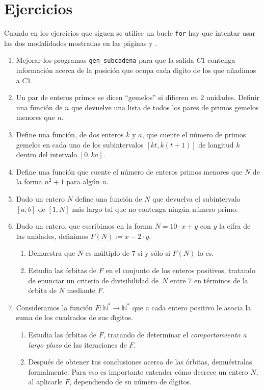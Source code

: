 \section{Ejercicios}\label{ej-program}





Cuando en los ejercicios que siguen se utilice un bucle \lstinline|for| hay que
intentar usar las dos modalidades mostradas en las páginas
\pageref{for-sintaxis1} y \pageref{for-sintaxis2}.


\begin{enumerate}
\item Mejorar los programas {\tt gen\_subcadena} para que la salida $C1$
contenga
informaci\'on acerca de la posici\'on que ocupa cada d\'{\i}gito de los que
a\~nadimos a $C1.$
 \item Un par de enteros primos se dicen ``gemelos'' si difieren en $2$
unidades. Definir una funci\'on de $n$ que devuelve una lista de todos los pares
de primos gemelos menores que $n$.
 \item Define una funci\'on, de dos enteros $k$ y $a$,  que cuente el n\'umero
de primos gemelos en cada uno de los subintervalos $[kt,k(t+1)]$ de longitud $k$
dentro del intervalo $[0,ka].$
 \item Define una funci\'on que cuente el n\'umero de enteros primos menores que
$N$ de la forma $n^2+1$ para alg\'un $n$.

 \item Dado un entero $N$ define una funci\'on de $N$ que devuelva  el
subintervalo $[a,b]$ de $[1,N]$ m\'as largo tal que no contenga ning\'un
n\'umero primo. 

\item Dado un entero, que escribimos en la forma  $N=10\cdot x+y$ con $y$ la
cifra de las unidades,   definimos $F(N):=x-2\cdot y.$
\begin{enumerate}
\item Demuestra que $N$ es m\'ultiplo de $7$ si y s\'olo si $F(N)$ lo es.
\item Estudia las \'orbitas de $F$ en el conjunto de los enteros positivos,
tratando de enunciar un criterio de divisibilidad de~$N$ entre  $7$ en
t\'erminos de la \'orbita de $N$ mediante $F$.
\end{enumerate} 

\item Consideramos la funci\'on $F:\mathbb{N^*}\to \mathbb{N^*}$ que a cada
entero positivo le asocia la suma de los cuadrados de sus d\'{\i}gitos.
\begin{enumerate}
\item Estudia las \'orbitas de $F$,  tratando de determinar el {\itshape
comportamiento a largo plazo} de las iteraciones de $F$.
\item Despu\'es de obtener tus conclusiones acerca de las \'orbitas,
demu\'estralas formalmente. Para eso es importante entender c\'omo decrece un
entero $N$, al aplicarle $F$, dependiendo de su n\'umero de d\'{\i}gitos.
\end{enumerate} 


\end{enumerate}
